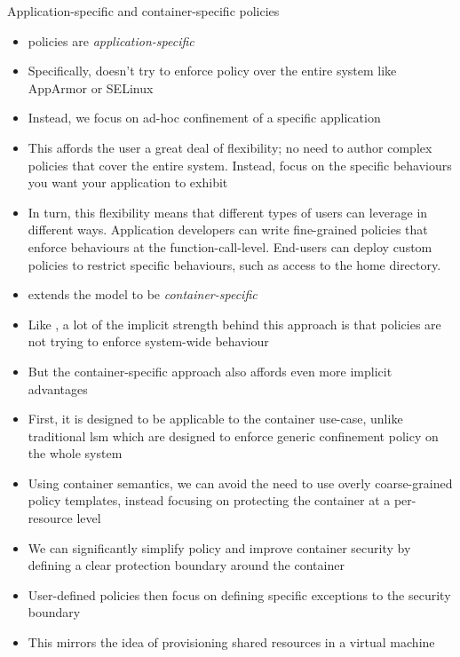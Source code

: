\begin{inprogress}
  Application-specific and container-specific policies
  \begin{itemize}
    \item \bpfbox{} policies are \textit{application-specific}
    \item Specifically, \bpfbox{} doesn't try to enforce policy over the entire system like AppArmor or SELinux
    \item Instead, we focus on ad-hoc confinement of a specific application
    \item This affords the user a great deal of flexibility; no need to author complex policies that cover the entire system. Instead, focus on the specific behaviours you want your application to exhibit
    \item In turn, this flexibility means that different types of users can leverage \bpfbox{} in different ways. Application developers can write fine-grained policies that enforce behaviours at the function-call-level. End-users can deploy custom \bpfbox{} policies to restrict specific behaviours, such as access to the home directory.

    \item \bpfcontain{} extends the \bpfbox{} model to be \textit{container-specific}
    \item Like \bpfbox{}, a lot of the implicit strength behind this approach is that policies are not trying to enforce system-wide behaviour
    \item But the container-specific approach also affords even more implicit advantages
    \item First, it is designed to be applicable to the container use-case, unlike traditional \gls{lsm} which are designed to enforce generic confinement policy on the whole system
    \item Using container semantics, we can avoid the need to use overly coarse-grained policy templates, instead focusing on protecting the container at a per-resource level
    \item We can significantly simplify policy and improve container security by defining a clear protection boundary around the container
    \item User-defined policies then focus on defining specific exceptions to the security boundary
    \item This mirrors the idea of provisioning shared resources in a virtual machine
  \end{itemize}
\end{inprogress}

